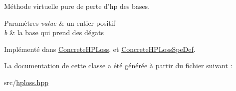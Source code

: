 Méthode virtuelle pure de perte d'hp des bases. 


\begin{DoxyParams}{Paramètres}
{\em value} & un entier positif \\
\hline
{\em b} & la base qui prend des dégats \\
\hline
\end{DoxyParams}


Implémenté dans \hyperlink{classConcreteHPLoss_ae15f6aa597fdc1e1fce3326beb90c335}{Concrete\+H\+P\+Loss}, et \hyperlink{classConcreteHPLossSpeDef_ad7b1e1fa122742674fe53e89a6c4b261}{Concrete\+H\+P\+Loss\+Spe\+Def}.



La documentation de cette classe a été générée à partir du fichier suivant \+:\begin{DoxyCompactItemize}
\item 
src/\hyperlink{hploss_8hpp}{hploss.\+hpp}\end{DoxyCompactItemize}
